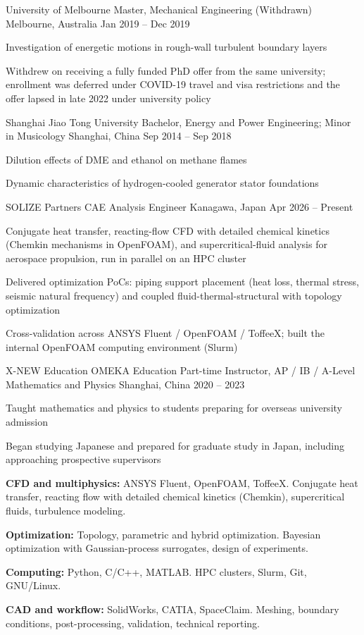\documentclass[9pt,a4paper]{extarticle}
\begin{document}
\eduentry
  {University of Melbourne}
  {Master, Mechanical Engineering (Withdrawn)}
  {Melbourne, Australia}
  {Jan 2019 -- Dec 2019}
  {\item Investigation of energetic motions in rough-wall turbulent boundary layers
   \item[] Withdrew on receiving a fully funded PhD offer from the same university; enrollment was deferred under COVID-19 travel and visa restrictions and the offer lapsed in late 2022 under university policy}

\eduentry
  {Shanghai Jiao Tong University}
  {Bachelor, Energy and Power Engineering; Minor in Musicology}
  {Shanghai, China}
  {Sep 2014 -- Sep 2018}
  {\item Dilution effects of DME and ethanol on methane flames
   \item Dynamic characteristics of hydrogen-cooled generator stator foundations}



\eduentry
  {SOLIZE Partners}
  {CAE Analysis Engineer}
  {Kanagawa, Japan}
  {Apr 2026 -- Present}
  {\item Conjugate heat transfer, reacting-flow CFD with detailed chemical kinetics (Chemkin mechanisms in OpenFOAM), and supercritical-fluid analysis for aerospace propulsion, run in parallel on an HPC cluster
   \item Delivered optimization PoCs: piping support placement (heat loss, thermal stress, seismic natural frequency) and coupled fluid-thermal-structural with topology optimization
   \item Cross-validation across ANSYS Fluent / OpenFOAM / ToffeeX; built the internal OpenFOAM computing environment (Slurm)}

\eduentry
  {X-NEW Education \textperiodcentered{} OMEKA Education}
  {Part-time Instructor, AP / IB / A-Level Mathematics and Physics}
  {Shanghai, China}
  {2020 -- 2023}
  {\item Taught mathematics and physics to students preparing for overseas university admission
   \item Began studying Japanese and prepared for graduate study in Japan, including approaching prospective supervisors}

\vspace{4pt}
\begin{cvitems}
  \item \textbf{CFD and multiphysics:} ANSYS Fluent, OpenFOAM, ToffeeX. Conjugate heat transfer, reacting flow with detailed chemical kinetics (Chemkin), supercritical fluids, turbulence modeling.
  \item \textbf{Optimization:} Topology, parametric and hybrid optimization. Bayesian optimization with Gaussian-process surrogates, design of experiments.
  \item \textbf{Computing:} Python, C/C++, MATLAB. HPC clusters, Slurm, Git, GNU/Linux.
  \item \textbf{CAD and workflow:} SolidWorks, CATIA, SpaceClaim. Meshing, boundary conditions, post-processing, validation, technical reporting.
\end{cvitems}

\vspace{3pt}
\end{document}
